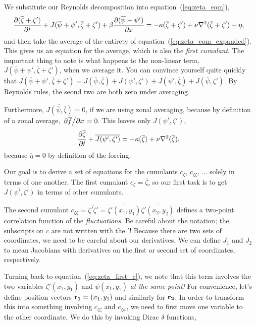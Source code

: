 \documentclass{paper}
\newcommand*{\reynolds}[1]{\mean{#1} + #1'}
\newcommand*{\mean}[1]{\overline{#1}}
\newcommand{\cz}{c_\zeta}
\newcommand{\czz}{c_{\zeta\zeta}}
\newcommand{\czp}{c_{\zeta\psi}}
\newcommand{\rr}[1]{\vb{r_{#1}}}
\begin{document}
We substitute our Reynolds decomposition into equation~(\ref{eq:zeta_eom}),
\begin{equation}
  \label{eq:zeta_eom_expanded}
  \pdv{(\reynolds{\zeta})}{t} + J(\reynolds{\psi}, \reynolds{\zeta}) + \beta \pdv{(\reynolds{\psi})}{x} = -\kappa (\reynolds{\zeta}) + \nu \laplacian{(\reynolds{\zeta})} + \eta,
\end{equation}
and then take the average of the entirety of equation~(\ref{eq:zeta_eom_expanded}). This gives us an equation for the average, which is also the \emph{first cumulant}. The important thing to note is what happens to the non-linear term, $J(\reynolds{\psi}, \reynolds{\zeta})$, when we average it. You can convince yourself quite quickly that $J(\reynolds{\psi}, \reynolds{\zeta}) = J(\mean{\psi}, \mean{\zeta}) + J(\psi', \zeta') + J(\psi', \mean{\zeta}) + J(\mean{\psi}, \zeta')$. By Reynolds rules, the seond two are both zero under averaging.

Furthermore, $\mean{J(\mean{\psi}, \mean{\zeta})} = 0$, if we are using zonal averaging, because by definition of a zonal average, $\pdv*{\mean{f}}{x} = 0$. This leaves only $\mean{J(\psi', \zeta')}$,
% 
\begin{equation}
  \label{eq:zeta_first_c}
  \pdv{\mean{\zeta}}{t} + \mean{J(\psi', \zeta')}  = -\kappa (\mean{\zeta}) + \nu \laplacian{(\mean{\zeta})},
\end{equation}
because $\mean{\eta} = 0$ by definition of the forcing.

Our goal is to derive a set of equations for the cumulants $\cz$, $\czz$, $\ldots$ solely in terms of one another. The first cumulant $\cz = \mean{\zeta}$, so our first task is to get $\mean{J(\psi', \zeta')}$ in terms of other cumulants.

The second cumulant $\czz = \mean{\zeta' \zeta'} = \mean{\zeta'(x_1, y_1)} \mean{\zeta'(x_2, y_2)}$ defines a two-point correlation function of the \emph{fluctuations}. Be careful about the notation; the subscripts on $c$ are not written with the $'$! Because there are two sets of coordinates, we need to be careful about our derivatives. We can define $J_1$ and $J_2$ to mean Jacobians with derivatives on the first or second set of coordinates, respectively.

Turning back to equation~(\ref{eq:zeta_first_c}), we note that this term involves the two variables $\zeta'(x_1, y_1)$ and $\psi(x_1, y_1)$ \emph{at the same point!} For convenience, let's define position vectors $\rr1 = (x_1, y_1)$ and similarly for $\rr2$. In order to transform this into something involving $\czz$ and $\czp$, we need to first move one variable to the other coordinate. We do this by invoking Dirac $\delta$ functions,
\end{document}
